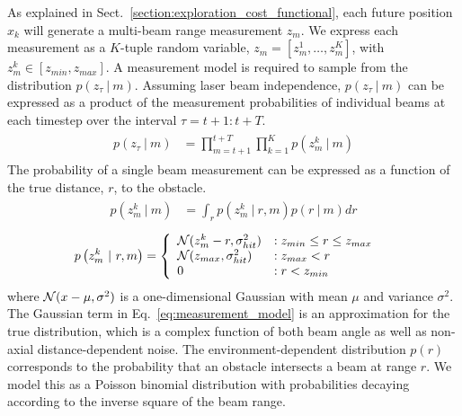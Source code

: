 \documentclass[conference]{IEEEtran}
\begin{document}
As explained in Sect.~\ref{section:exploration_cost_functional}, each future position $x_{k}$ will generate a multi-beam range measurement $z_{m}$. We express each measurement as a $K$-tuple random variable, $z_{m} = \left[z_{m}^{1}, \dots, z_{m}^{K}\right]$, with $z_{m}^{k} \in \left[z_{min}, z_{max}\right]$. A measurement model is required to sample from the distribution $p(z_{\tau} \ \vert \ m)$. Assuming laser beam independence, $p(z_{\tau} \ \vert \ m)$ can be expressed as a product of the measurement probabilities of individual beams at each timestep over the interval $\tau = t+1:t+T$.
%
\begin{align}
  \begin{split}
    p
    \left(
    z_{\tau}
    \ \vert \
    m
    \right)
    &=
    \prod_{m=t+1}^{t+T}
    \prod_{k=1}^{K}
    p
    \left(
    z_{m}^{k}
    \ \vert \
    m
    \right)
  \end{split}
\end{align}
%
The probability of a single beam measurement can be expressed as a function of the true distance, $r$, to the obstacle.
%
\begin{align}
  \begin{split}
    p
    \left(
    z_{m}^{k}
    \ \vert \
    m
    \right)
    &=
    \int_{r}
    p
    \left(
    z_{m}^{k}
    \ \vert \
    r
    ,
    m
    \right)
    p
    \left(
    r
    \ \vert \
    m
    \right)
    dr
  \end{split}
\end{align}
%
\begin{align}
  \begin{split}
    p
    \left(
    z_{m}^{k}
    \ \vert \
    r
    ,
    m
    \right)
    &=
    \left\{
    \begin{array}{ll}
      \mc{N}(z_{m}^{k} - r, \sigma_{hit}^{2}) &: z_{min} \le r \le z_{max} \\
            \mc{N}(z_{max}, \sigma_{hit}^{2}) &: z_{max} < r \\
                                            0 &: r < z_{min}
    \end{array}
    \right.
    \label{eq:measurement_model}
  \end{split}
\end{align}
%
where $\mathcal{N}(x - \mu, \sigma^{2})$ is a one-dimensional Gaussian with mean $\mu$ and variance $\sigma^{2}$. The Gaussian term in Eq.~\eqref{eq:measurement_model} is an approximation for the true distribution, which is a complex function of both beam angle as well as non-axial distance-dependent noise. The environment-dependent distribution $p(r)$ corresponds to the probability that an obstacle intersects a beam at range $r$. We model this as a Poisson binomial distribution with probabilities decaying according to the inverse square of the beam range.
\end{document}

